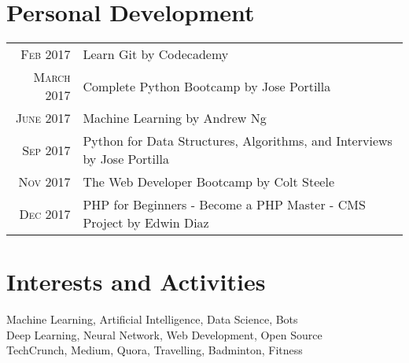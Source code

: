 \documentclass[a4paper,10pt]{article}
\begin{document}
\section{Personal Development}
\begin{tabular}{rl}
\textsc{Feb} 2017 & Learn Git by Codecademy \normalsize\\
\textsc{March} 2017 & Complete Python Bootcamp by Jose Portilla \normalsize\\
\textsc{June} 2017 & Machine Learning by Andrew Ng \normalsize\\
\textsc{Sep} 2017 & Python for Data Structures, Algorithms, and Interviews by Jose Portilla \normalsize\\
\textsc{Nov} 2017 & The Web Developer Bootcamp by Colt Steele \normalsize\\
\textsc{Dec} 2017 & PHP for Beginners - Become a PHP Master - CMS Project by Edwin Diaz \normalsize\\
\end{tabular}


\section{Interests and Activities}
Machine Learning, Artificial Intelligence, Data Science, Bots\\
Deep Learning, Neural Network, Web Development, Open Source\\
TechCrunch, Medium, Quora, Travelling, Badminton, Fitness\\



\end{document}
